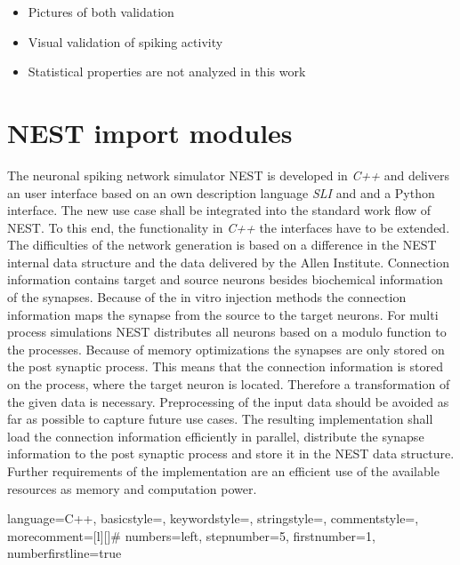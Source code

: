 \begin{itemize}
      \item Pictures of both validation
      \item Visual validation of spiking activity
      \item Statistical properties are not analyzed in this work 
\end{itemize}

\section{NEST import modules}
The neuronal spiking network simulator NEST is developed in \emph{C++} and delivers
an user interface based on an own description language \emph{SLI} and  and a Python interface.
The new use case shall be integrated into the standard work flow of NEST.
To this end, the functionality in \emph{C++} the interfaces have to be extended.
The difficulties of the network generation is based on a difference in 
the NEST internal data structure and the data delivered by the Allen Institute.
Connection information contains target and source neurons besides biochemical
information of the synapses. Because of the in vitro injection methods the
connection information maps the synapse from the source to the target neurons.
For multi process simulations NEST distributes all neurons based on a modulo function 
to the processes. Because of memory optimizations the synapses are only stored on the
post synaptic process. This means that the connection information is stored
on the process, where the target neuron is located. Therefore a transformation of the given data is
necessary. Preprocessing of the input data should be avoided as far as possible to capture
future use cases.
The resulting implementation shall load the connection information efficiently in parallel,
distribute the synapse information to the post synaptic process and store it in
the NEST data structure.
Further requirements of the implementation are an efficient use of the available resources as
memory and computation power. 


 {language=C++,
                basicstyle=\small\ttfamily,
                keywordstyle=\color{blue}\ttfamily,
                stringstyle=\color{red}\ttfamily,
                commentstyle=\color{green}\ttfamily,
                morecomment=[l][\color{magenta}]{\#}
                numbers=left,
  				stepnumber=5,    
  				firstnumber=1,
 				numberfirstline=true
}

